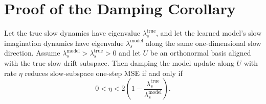 
\section{Proof of the Damping Corollary}
\label{app:damping_corollary}

\begin{corollary}
Let the true slow dynamics have eigenvalue $\lambda_s^{\mathrm{true}}$, and
let the learned model's slow imagination dynamics have eigenvalue
$\lambda_s^{\mathrm{model}}$ along the same one-dimensional slow direction.
Assume $\lambda_s^{\mathrm{model}}>\lambda_s^{\mathrm{true}}>0$ and let $U$
be an orthonormal basis aligned with the true slow drift subspace. Then damping
the model update along $U$ with rate $\eta$ reduces slow-subspace one-step MSE
if and only if
\begin{equation}
    0 < \eta
    <
    2\left(1 -
    \frac{\lambda_s^{\mathrm{true}}}{\lambda_s^{\mathrm{model}}}
    \right).
\end{equation}
\end{corollary}

